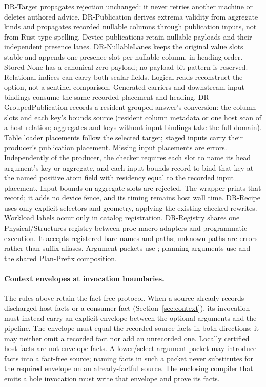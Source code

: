 DR-Target propagates rejection unchanged: it never retries another machine or
deletes authored advice. DR-Publication derives extrema validity from aggregate
kinds and propagates recorded nullable columns through publication inputs, not
from Rust type spelling. Device publications retain nullable payloads and
their independent presence lanes. DR-NullableLanes keeps the original value
slots stable and appends one presence slot per nullable column, in heading
order. Stored None has a canonical zero payload; no payload bit pattern is
reserved. Relational indices can carry both scalar fields. Logical reads
reconstruct the option, not a sentinel comparison. Generated carriers and
downstream input bindings consume the same recorded placement and heading.
DR-GroupedPublication records a resident grouped answer's conversion: the
column slots and each key's bounds source (resident column metadata or one host
scan of a host relation; aggregates and keys without input bindings take the full
domain). Table loader placements follow the selected target; staged inputs carry
their producer's publication placement. Missing input placements are errors.
Independently of the producer, the checker requires each slot to name its head
argument's key or aggregate, and each input bounds record to bind that key at
the named positive atom field with residency equal to the recorded input
placement. Input bounds on aggregate slots are rejected. The wrapper prints
that record; it adds no device fence, and its timing remains host wall time.
DR-Recipe uses only explicit selectors and geometry, applying the existing
checked rewrites. Workload labels occur only in catalog registration.
DR-Registry shares one Physical/Structures registry between proc-macro adapters
and programmatic execution. It accepts registered bare names and
 paths; unknown paths are errors rather than suffix
aliases. Argument packets use ; planning arguments
use  and the shared Plan-Prefix composition.

\paragraph{Context envelopes at invocation boundaries.}
The rules above retain the fact-free protocol. When a source already records
discharged host facts or a consumer fact (Section~\ref{sec:context}), its
invocation must instead carry an explicit  envelope
between the optional arguments and the pipeline. The envelope must equal
the recorded source facts in both directions: it may neither omit a recorded
fact nor add an unrecorded one. Locally certified host facts are not envelope
facts. A lower/select argument packet may introduce facts into a fact-free
source; naming facts in such a packet never substitutes for the required
envelope on an already-factful source. The enclosing compiler that emits a
hole invocation must write that envelope and prove its facts.

